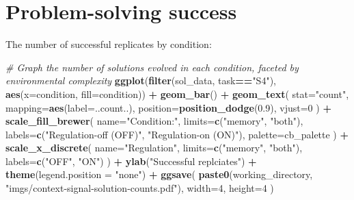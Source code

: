 \documentclass[]{book}
\newenvironment{Shaded}{\begin{snugshade}}{\end{snugshade}}
\newcommand{\CommentTok}[1]{\textcolor[rgb]{0.56,0.35,0.01}{\textit{#1}}}
\newcommand{\DataTypeTok}[1]{\textcolor[rgb]{0.13,0.29,0.53}{#1}}
\newcommand{\DecValTok}[1]{\textcolor[rgb]{0.00,0.00,0.81}{#1}}
\newcommand{\FloatTok}[1]{\textcolor[rgb]{0.00,0.00,0.81}{#1}}
\newcommand{\KeywordTok}[1]{\textcolor[rgb]{0.13,0.29,0.53}{\textbf{#1}}}
\newcommand{\NormalTok}[1]{#1}
\newcommand{\OperatorTok}[1]{\textcolor[rgb]{0.81,0.36,0.00}{\textbf{#1}}}
\newcommand{\StringTok}[1]{\textcolor[rgb]{0.31,0.60,0.02}{#1}}
\begin{document}
\hypertarget{problem-solving-success-1}{%
\section{Problem-solving success}\label{problem-solving-success-1}}

The number of successful replicates by condition:

\begin{Shaded}
\begin{Highlighting}[]
\CommentTok{# Graph the number of solutions evolved in each condition, faceted by environmental complexity}
\KeywordTok{ggplot}\NormalTok{(}\KeywordTok{filter}\NormalTok{(sol_data, task}\OperatorTok{==}\StringTok{"S4"}\NormalTok{), }\KeywordTok{aes}\NormalTok{(}\DataTypeTok{x=}\NormalTok{condition, }\DataTypeTok{fill=}\NormalTok{condition)) }\OperatorTok{+}
\StringTok{  }\KeywordTok{geom_bar}\NormalTok{() }\OperatorTok{+}
\StringTok{  }\KeywordTok{geom_text}\NormalTok{(}
    \DataTypeTok{stat=}\StringTok{"count"}\NormalTok{,}
    \DataTypeTok{mapping=}\KeywordTok{aes}\NormalTok{(}\DataTypeTok{label=}\NormalTok{..count..),}
    \DataTypeTok{position=}\KeywordTok{position_dodge}\NormalTok{(}\FloatTok{0.9}\NormalTok{),}
    \DataTypeTok{vjust=}\DecValTok{0}
\NormalTok{  ) }\OperatorTok{+}
\StringTok{  }\KeywordTok{scale_fill_brewer}\NormalTok{(}
    \DataTypeTok{name=}\StringTok{"Condition:"}\NormalTok{,}
    \DataTypeTok{limits=}\KeywordTok{c}\NormalTok{(}\StringTok{"memory"}\NormalTok{, }\StringTok{"both"}\NormalTok{),}
    \DataTypeTok{labels=}\KeywordTok{c}\NormalTok{(}\StringTok{"Regulation-off (OFF)"}\NormalTok{, }\StringTok{"Regulation-on (ON)"}\NormalTok{),}
    \DataTypeTok{palette=}\NormalTok{cb_palette}
\NormalTok{  ) }\OperatorTok{+}
\StringTok{  }\KeywordTok{scale_x_discrete}\NormalTok{(}
    \DataTypeTok{name=}\StringTok{"Regulation"}\NormalTok{,}
    \DataTypeTok{limits=}\KeywordTok{c}\NormalTok{(}\StringTok{"memory"}\NormalTok{, }\StringTok{"both"}\NormalTok{),}
    \DataTypeTok{labels=}\KeywordTok{c}\NormalTok{(}\StringTok{"OFF"}\NormalTok{, }\StringTok{"ON"}\NormalTok{)}
\NormalTok{  ) }\OperatorTok{+}
\StringTok{  }\KeywordTok{ylab}\NormalTok{(}\StringTok{"Successful replciates"}\NormalTok{) }\OperatorTok{+}
\StringTok{  }\KeywordTok{theme}\NormalTok{(}\DataTypeTok{legend.position =} \StringTok{"none"}\NormalTok{) }\OperatorTok{+}
\StringTok{  }\KeywordTok{ggsave}\NormalTok{(}
    \KeywordTok{paste0}\NormalTok{(working_directory, }\StringTok{"imgs/context-signal-solution-counts.pdf"}\NormalTok{),}
    \DataTypeTok{width=}\DecValTok{4}\NormalTok{,}
    \DataTypeTok{height=}\DecValTok{4}
\NormalTok{  )}
\end{Highlighting}
\end{Shaded}
\end{document}
